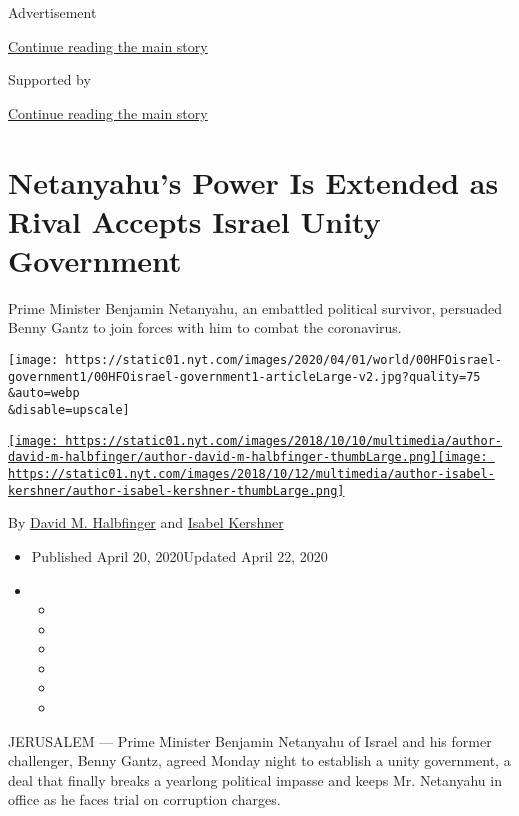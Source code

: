 Advertisement

\protect\hyperlink{after-top}{Continue reading the main story}

Supported by

\protect\hyperlink{after-sponsor}{Continue reading the main story}

\hypertarget{netanyahus-power-is-extended-as-rival-accepts-israel-unity-government}{%
\section{Netanyahu's Power Is Extended as Rival Accepts Israel Unity
Government}\label{netanyahus-power-is-extended-as-rival-accepts-israel-unity-government}}

Prime Minister Benjamin Netanyahu, an embattled political survivor,
persuaded Benny Gantz to join forces with him to combat the coronavirus.

\texttt{[image: https://static01.nyt.com/images/2020/04/01/world/00HFOisrael-government1/00HFOisrael-government1-articleLarge-v2.jpg?quality=75\\\&auto=webp\\\&disable=upscale]}

\href{https://www.nytimes.com/by/david-m-halbfinger}{\texttt{[image: https://static01.nyt.com/images/2018/10/10/multimedia/author-david-m-halbfinger/author-david-m-halbfinger-thumbLarge.png]}}\href{https://www.nytimes.com/by/isabel-kershner}{\texttt{[image: https://static01.nyt.com/images/2018/10/12/multimedia/author-isabel-kershner/author-isabel-kershner-thumbLarge.png]}}

By \href{https://www.nytimes.com/by/david-m-halbfinger}{David M.
Halbfinger} and \href{https://www.nytimes.com/by/isabel-kershner}{Isabel
Kershner}

\begin{itemize}
\item
  Published April 20, 2020Updated April 22, 2020
\item
  \begin{itemize}
  \item
  \item
  \item
  \item
  \item
  \item
  \end{itemize}
\end{itemize}

JERUSALEM --- Prime Minister Benjamin Netanyahu of Israel and his former
challenger, Benny Gantz, agreed Monday night to establish a unity
government, a deal that finally breaks a yearlong political impasse and
keeps Mr. Netanyahu in office as he faces trial on corruption charges.

